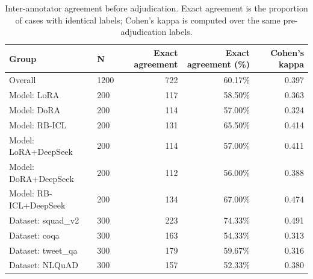 \begin{table}[htbp]
\centering
\small
\begin{tabular}{llrrr}
\toprule
Group & N & Exact agreement & Exact agreement (\%) & Cohen's kappa \\
\midrule
Overall & 1200 & 722 & 60.17\% & 0.397 \\
Model: LoRA & 200 & 117 & 58.50\% & 0.363 \\
Model: DoRA & 200 & 114 & 57.00\% & 0.324 \\
Model: RB-ICL & 200 & 131 & 65.50\% & 0.414 \\
Model: LoRA+DeepSeek & 200 & 114 & 57.00\% & 0.411 \\
Model: DoRA+DeepSeek & 200 & 112 & 56.00\% & 0.388 \\
Model: RB-ICL+DeepSeek & 200 & 134 & 67.00\% & 0.474 \\
Dataset: squad\_v2 & 300 & 223 & 74.33\% & 0.491 \\
Dataset: coqa & 300 & 163 & 54.33\% & 0.313 \\
Dataset: tweet\_qa & 300 & 179 & 59.67\% & 0.316 \\
Dataset: NLQuAD & 300 & 157 & 52.33\% & 0.380 \\
\bottomrule
\end{tabular}
\caption{Inter-annotator agreement before adjudication. Exact agreement is the proportion of cases with identical labels; Cohen's kappa is computed over the same pre-adjudication labels.}
\label{tab:interannotator_agreement}
\end{table}
